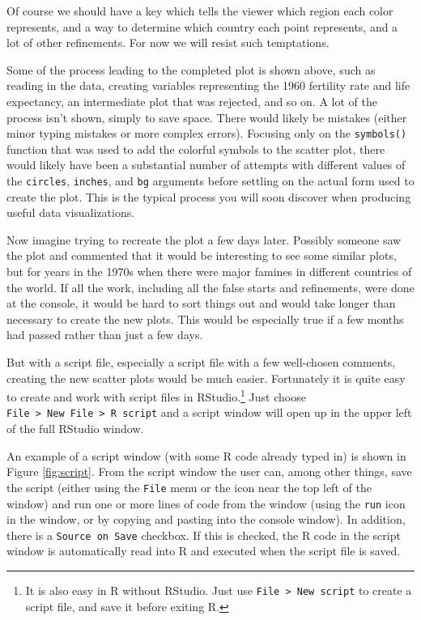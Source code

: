 \documentclass[]{krantz}
\begin{document}
Of course we should have a key which tells the viewer which region each color represents, and a way to determine which country each point represents, and a lot of other refinements. For now we will resist such temptations.

Some of the process leading to the completed plot is shown above, such as reading in the data, creating variables representing the 1960 fertility rate and life expectancy, an intermediate plot that was rejected, and so on. A lot of the process isn't shown, simply to save space. There would likely be mistakes (either minor typing mistakes or more complex errors). Focusing only on the \texttt{symbols()} function that was used to add the colorful symbols to the scatter plot, there would likely have been a substantial number of attempts with different values of the \texttt{circles}, \texttt{inches}, and \texttt{bg} arguments before settling on the actual form used to create the plot. This is the typical process you will soon discover when producing useful data visualizations.

Now imagine trying to recreate the plot a few days later. Possibly someone saw the plot and commented that it would be interesting to see some similar plots, but for years in the 1970s when there were major famines in different countries of the world. If all the work, including all the false starts and refinements, were done at the console, it would be hard to sort things out and would take longer than necessary to create the new plots. This would be especially true if a few months had passed rather than just a few days.

But with a script file, especially a script file with a few well-chosen comments, creating the new scatter plots would be much easier. Fortunately it is quite easy to create and work with script files in RStudio.\footnote{It is also easy in R without RStudio. Just use \texttt{File\ \textgreater{}\ New\ script} to create a script file, and save it before exiting R.} Just choose \texttt{File\ \textgreater{}\ New\ File\ \textgreater{}\ R\ script} and a script window will open up in the upper left of the full RStudio window.

An example of a script window (with some R code already typed in) is shown in Figure \ref{fig:script}. From the script window the user can, among other things, save the script (either using the \texttt{File} menu or the icon near the top left of the window) and run one or more lines of code from the window (using the \texttt{run} icon in the window, or by copying and pasting into the console window). In addition, there is a \texttt{Source\ on\ Save} checkbox. If this is checked, the R code in the script window is automatically read into R and executed when the script file is saved.
\end{document}
